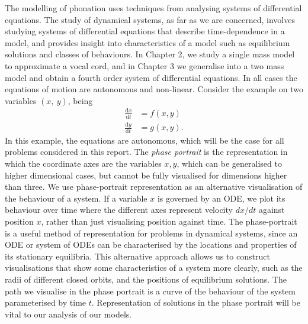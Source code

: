 \documentclass{report}
\begin{document}
The modelling of phonation uses techniques from analysing systems of differential equations.
The study of dynamical systems, as far as we are concerned,
involves studying systems of differential equations that describe time-dependence in a model,
and provides insight into characteristics of a model such as equilibrium solutions and classes of behaviours.
In Chapter 2, we study a single mass model to approximate a vocal cord,
and in Chapter 3 we generalise into a two mass model and obtain a fourth order system of differential equations.
In all cases the equations of motion are autonomous and non-linear.
Consider the example on two variables \((x,~y)\), being
\begin{equation}
    \begin{aligned}
        \frac{\mathrm{d}x}{\mathrm{d}t} &= f(x,y) \\
        \frac{\mathrm{d}y}{\mathrm{d}t} &= g(x,y).
    \end{aligned}
\end{equation}
In this example,
the equations are autonomous,
which will be the case for all problems considered in this report.
The \textit{phase portrait} is the representation in which the coordinate axes are the variables $x,y$,
which can be generalised to higher dimensional cases,
but cannot be fully visualised for dimensions higher than three.
We use phase-portrait representation as an alternative visualisation of the behaviour of a system.
If a variable $x$ is governed by an ODE,
we plot its behaviour over time where the different axes represent velocity $dx/dt$ against position $x$,
rather than just visualising position against time.
The phase-portrait is a useful method of representation for problems in dynamical systems,
since an ODE or system of ODEs can be characterised by the locations and properties of its stationary equilibria.
This alternative approach allows us to construct visualisations that show some characteristics of a system more clearly, such as the radii of different closed orbits,
and the positions of equilibrium solutions.
The path we visualise in the phase portrait is a curve of the behaviour of the system parameterised by time $t$. 
Representation of solutions in the phase portrait will be vital to our analysis of our models.
\end{document}
